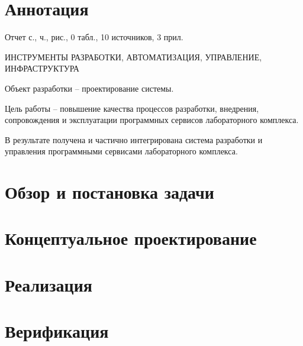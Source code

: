 \documentclass{thesis}
\begin{document}
	 

	\chapter*{Аннотация}

	Отчет \pageref{LastPage} с.,  ч.,  рис., 0 табл., 10 источников, 3
	прил.

	\bigskip
	ИНСТРУМЕНТЫ РАЗРАБОТКИ, АВТОМАТИЗАЦИЯ, УПРАВЛЕНИЕ,
	\linebreak
	ИНФРАСТРУКТУРА
	\bigskip

	Объект разработки -- проектирование системы.

	Цель работы -- повышение качества процессов разработки, внедрения, сопровождения и эксплуатации
	программных сервисов лабораторного комплекса.

	В результате получена и частично интегрирована система разработки и управления программными
	сервисами лабораторного комплекса.

	\renewcommand{\contentsname}{Содержание}
	\tableofcontents
	\newpage
	\setcounter{page}{5}


	\chapter{Обзор и постановка задачи}
	

	\chapter{Концептуальное проектирование}
	

	\chapter{Реализация}
	

	\chapter{Верификация}
	


	\sloppy
	\printbibliography

	\label{apx:1}

	\label{apx:2}

	\label{apx:3}
\end{document}
